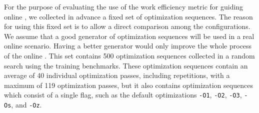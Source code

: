 For the purpose of evaluating the use of the work efficiency metric for guiding
online {\itercomp}, we collected in advance a fixed set of optimization sequences.
The reason for using this fixed set is to allow a direct comparison among the configurations.
We assume that a good generator of optimization sequences will be used in a real online scenario.
Having a better generator would only improve the whole process of the online {\itercomp}.
This set contains 500 optimization sequences collected in a random search using the training benchmarks.
These optimization sequences contain an average of 40 individual optimization passes,
including repetitions, with a maximum of 119 optimization passes, but it also contains
optimization sequences which consist of a single flag, such as the default optimizations
\texttt{-O1}, \texttt{-O2}, \texttt{-O3}, \texttt{-Os}, and \texttt{-Oz}.



